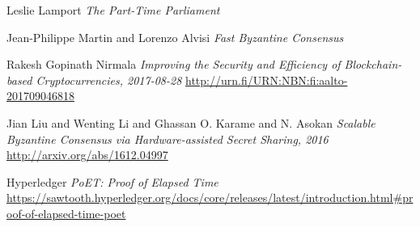 \documentclass[12pt]{article}
\begin{document}
\begin{thebibliography}{9}
		Leslie Lamport
		\textit{The Part-Time Parliament} 

		Jean-Philippe Martin and Lorenzo Alvisi
		\textit{Fast Byzantine Consensus}

		Rakesh Gopinath Nirmala
		\textit{Improving the Security and Efficiency of Blockchain-based Cryptocurrencies, 2017-08-28}
		\url{http://urn.fi/URN:NBN:fi:aalto-201709046818}

		Jian Liu and Wenting Li and Ghassan O. Karame and N. Asokan
 		\textit{Scalable Byzantine Consensus via Hardware-assisted Secret Sharing, 2016}
		\url{http://arxiv.org/abs/1612.04997}

		Hyperledger
		\textit{PoET: Proof of Elapsed Time}
		\url{https://sawtooth.hyperledger.org/docs/core/releases/latest/introduction.html#proof-of-elapsed-time-poet}

	\end{thebibliography}
\end{document}
